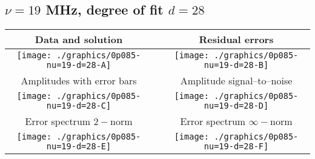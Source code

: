 

% 

\clearpage{}
\break{}

\subsection{$\nu = 19$ MHz, degree of fit $d = 28$}

\begin{table}[h]
    \begin{center}
        \begin{tabular}{ccc}
            Data and solution & \quad & Residual errors \\\hline
            \texttt{[image: ./graphics/0p085-nu=19-d=28-A]} &&
            \texttt{[image: ./graphics/0p085-nu=19-d=28-B]} \\[15pt]
            Amplitudes with error bars && Amplitude signal--to--noise \\\hline
            \texttt{[image: ./graphics/0p085-nu=19-d=28-C]} &&
            \texttt{[image: ./graphics/0p085-nu=19-d=28-D]} \\[15pt]
            Error spectrum $2-$norm && Error spectrum $\infty-$norm \\\hline
            \texttt{[image: ./graphics/0p085-nu=19-d=28-E]} &&
            \texttt{[image: ./graphics/0p085-nu=19-d=28-F]} \\[15pt]
        \end{tabular}
    \end{center}
\label{fig:elev=85, nu=19}
\end{table}



\endinput
